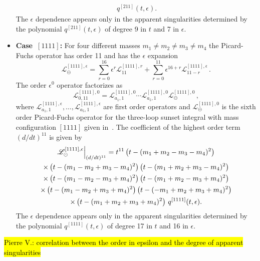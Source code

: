 \documentclass[a4paper,12pt]{article}
\numberwithin{equation}{section}
\numberwithin{figure}{section}
\def\su{\circleddash}
\newcommand{\pvnote}[1]{\sethlcolor{bubblegum} \protect\hl{Pierre V.: #1} \sethlcolor{yellow}}
\begin{document}
\begin{itemize}
\begin{multline}
                   \, q^{[211]}(t,\epsilon).
                 \end{multline}
                 The $\epsilon$ dependence appears only in the
                 apparent singularities determined by the polynomial
                 $q^{[211]}(t,\epsilon)$ of degree 9 in $t$  and 7 in $\epsilon$.
  \item   {\bf Case~$[1111]$:} For four different masses $m_1\neq m_2\neq m_3 \neq m_4$ the
  Picard-Fuchs operator has order 11 and has the $\epsilon$ expansion 
  \begin{equation}
    \mathscr{L}_\su^{[1111],\epsilon}=     \sum_{r=0}^{16}\epsilon^r
    \mathscr{L}^{[1111],r}_{11}+\sum_{r=0}^{11} \epsilon^{16+r}  \mathscr{L}^{[1111],\epsilon}_{11-r}\, .
  \end{equation}
    The order $\epsilon^0$ operator factorizes as
  \begin{equation}
         \mathscr{L}^{[1111],0}_{0,11}=   \mathscr{L}^{[1111],0}_{a_1,1}  \cdots  \mathscr{L}^{[1111],0}_{a_5,1}   \mathscr{L}^{[1111],0}_{\su}\,,
       \end{equation}
        where  $ \mathscr{L}^{[1111],\epsilon}_{a_1,1},\dots,  \mathscr{L}^{[1111],\epsilon}_{a_5,1}$ are  first order operators
       and $\mathscr{L}^{[1111],0}_{\su}$ is the sixth  order  Picard-Fuchs operator for the
       three-loop sunset integral with mass configuration $[1111]$
       given in~\cite{Lairez:2022zkj}.
        The coefficient of the highest order term $(d/dt)^{11}$    is given by
       \begin{multline}
                   \mathscr{L}^{[1111],\epsilon}_\su\Big\vert_{(d/dt)^{11}}=
                   t^{11}\left(t-(m_{1}+m_{2}-m_{3}-m_{4})^2\right) \cr\times
   \left(t-(m_{1}-m_{2}+m_{3}-m_{4})^2\right)
   \left(t-(m_{1}+m_{2}+m_{3}-m_{4})^2\right) \cr\times
   \left(t-(m_{1}-m_{2}-m_{3}+m_{4})^2\right)
   \left(t-(m_{1}+m_{2}-m_{3}+m_{4})^2\right)\cr\times
   \left(t-(m_{1}-m_{2}+m_{3}+m_{4})^2\right)
   \left(t-(-m_{1}+m_{2}+m_{3}+m_{4})^2\right) \cr\times
   \left(t-(m_{1}+m_{2}+m_{3}+m_{4})^2\right)
                   \, q^{[1111]}(t,\epsilon).
                 \end{multline}
                 The $\epsilon$ dependence appears only in the
                 apparent singularities determined by the polynomial
                 $q^{[1111]}(t,\epsilon)$ of degree 17 in
                 $t$ and 16 in $\epsilon$.
     \end{itemize}
\pvnote{correlation between the order in epsilon and the degree of
  apparent singularities}  
\end{document}
